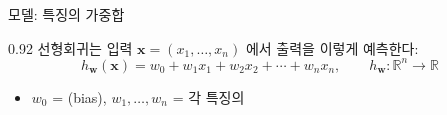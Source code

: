 \begin{frame}{모델: 특징의 가중합}
\begin{center}\begin{varwidth}{0.92\textwidth}
  선형회귀는 입력 $\boldsymbol{x} = (x_1, \ldots, x_n)$ 에서 출력을 이렇게 예측한다:
  \[
  h_{\boldsymbol{w}}(\boldsymbol{x}) = w_0 + w_1 x_1 + w_2 x_2 + \cdots + w_n x_n,
  \qquad h_{\boldsymbol{w}}: \mathbb{R}^n \to \mathbb{R}
  \]
  \begin{itemize}
    \item $w_0$ = (bias), \; $w_1, \ldots, w_n$ = 각 특징의 
    
  \end{itemize}
\end{varwidth}\end{center}
\end{frame}
